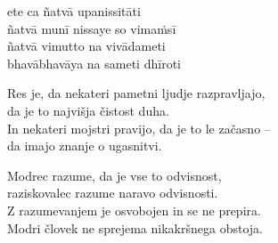 ete ca ñatvā upanissitāti\\
ñatvā munī nissaye so vimaṁsī\\
ñatvā vimutto na vivādameti\\
bhavābhavāya na sameti dhīroti


\clearpage

Res je, da nekateri pametni ljudje razpravljajo,\\
da je to najvišja čistost duha.\\
In nekateri mojstri pravijo, da je to le začasno --\\
da imajo znanje o ugasnitvi.

Modrec razume, da je vse to odvisnost,\\
raziskovalec razume naravo odvisnosti.\\
Z razumevanjem je osvobojen in se ne prepira.\\
Modri človek ne sprejema nikakršnega obstoja.

